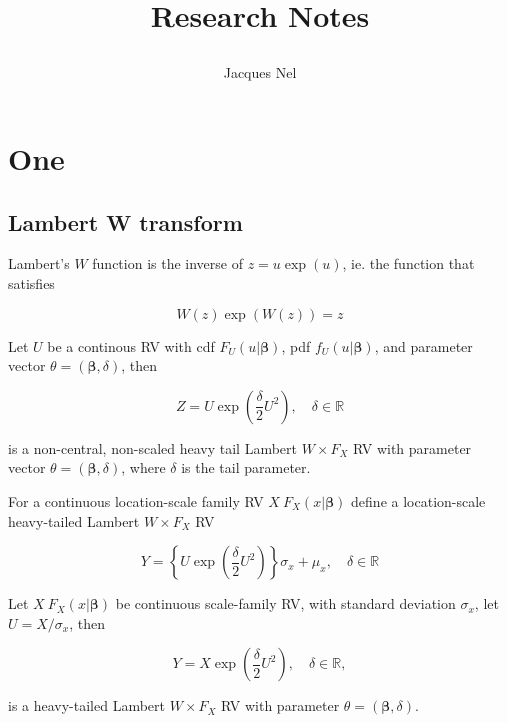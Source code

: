 \documentclass[8pt,oneside]{extbook}
\title{{Research Notes}\\\vspace{10pt}
    \author{Jacques Nel}
}
\newcommand{\Real}{\mathbb{R}}
\newcommand{\vect}[1]{\boldsymbol{#1}}
\begin{document}
\maketitle

\thispagestyle{empty}

\newpage


\chapter{One}
\section{Lambert W transform}

Lambert's $W$ function is the inverse of $z=u\exp(u)$, ie. the function that satisfies

\begin{equation}
W(z)\exp(W(z))= z
\end{equation}

Let $U$ be a continous RV with cdf $F_U (u|\vect{\beta})$,
pdf $f_U(u|\vect{\beta})$, and parameter vector $\theta=(\vect{\beta},\delta)$, then

\begin{equation}
Z = U\exp\left(\frac{\delta}{2}U^2\right),\quad\delta\in\Real
\end{equation}

is a non-central, non-scaled heavy tail Lambert $W\times F_X$ RV with
parameter vector $\theta=(\vect{\beta},\delta)$, where $\delta$ is the
tail parameter.

For a continuous location-scale family RV $X~F_X(x|\vect{\beta})$ define a
location-scale heavy-tailed Lambert $W\times F_X$ RV

\begin{equation}\label{eq:trans}
Y=\left\lbrace U\exp\left(\frac{\delta}{2}U^2\right)\right\rbrace
\sigma_x+\mu_x,\quad\delta\in\Real
\end{equation}

Let $X~F_X(x|\vect{\beta})$ be continuous scale-family RV, with
standard deviation $\sigma_x$, let $U=X/\sigma_x$, then

\begin{equation}
Y=X\exp\left(\frac{\delta}{2}U^2\right),\quad\delta\in\Real,
\end{equation}

is a heavy-tailed Lambert $W\times F_X$ RV with parameter 
$\theta=(\vect{\beta},\delta)$.
\end{document}
